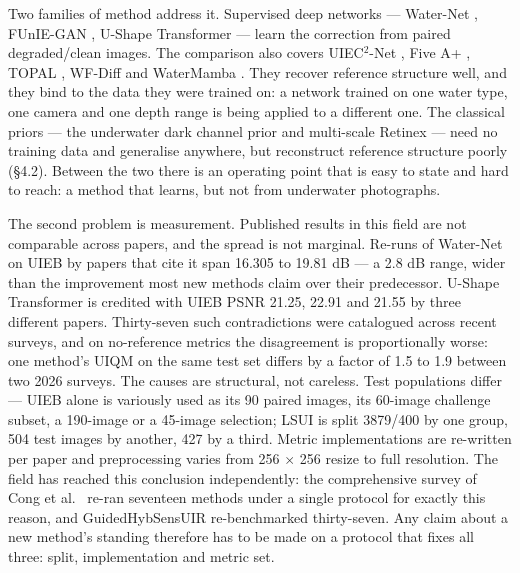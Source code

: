 \documentclass[journal]{IEEEtran}
\begin{document}
Two families of method address it. Supervised deep networks --- Water-Net \cite{li2020uieb}, FUnIE-GAN \cite{islam2020funie}, U-Shape Transformer \cite{peng2023ushape} --- learn the correction from paired degraded/clean images. The comparison also covers UIEC$^{2}$-Net \cite{wang2021uiec2}, Five A+ \cite{jiang2023fivea}, TOPAL \cite{jiang2022topal}, WF-Diff \cite{zhao2024wfdiff} and WaterMamba \cite{guan2024watermamba}. They recover reference structure well, and they bind to the data they were trained on: a network trained on one water type, one camera and one depth range is being applied to a different one. The classical priors --- the underwater dark channel prior \cite{drews2013udcp} and multi-scale Retinex \cite{jobson1997msr} --- need no training data and generalise anywhere, but reconstruct reference structure poorly (\S{}4.2). Between the two there is an operating point that is easy to state and hard to reach: a method that learns, but not from underwater photographs.

The second problem is measurement. Published results in this field are not comparable across papers, and the spread is not marginal. Re-runs of Water-Net on UIEB by papers that cite it span 16.305 to 19.81 dB --- a 2.8 dB range, wider than the improvement most new methods claim over their predecessor. U-Shape Transformer is credited with UIEB PSNR 21.25, 22.91 and 21.55 by three different papers. Thirty-seven such contradictions were catalogued across recent surveys, and on no-reference metrics the disagreement is proportionally worse: one method's UIQM on the same test set differs by a factor of 1.5 to 1.9 between two 2026 surveys. The causes are structural, not careless. Test populations differ --- UIEB alone is variously used as its 90 paired images, its 60-image challenge subset, a 190-image or a 45-image selection; LSUI is split 3879/400 by one group, 504 test images by another, 427 by a third. Metric implementations are re-written per paper and preprocessing varies from 256 $\times$ 256 resize to full resolution. The field has reached this conclusion independently: the comprehensive survey of Cong et al.~\cite{cong2024survey} re-ran seventeen methods under a single protocol for exactly this reason, and GuidedHybSensUIR \cite{guo2025guidedhyb} re-benchmarked thirty-seven. Any claim about a new method's standing therefore has to be made on a protocol that fixes all three: split, implementation and metric set.
\end{document}
